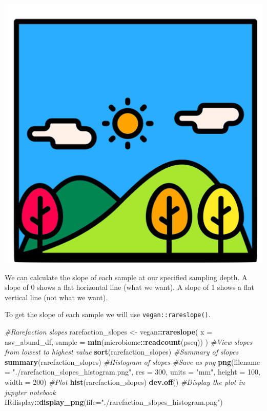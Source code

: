 \documentclass[
]{book}
\newenvironment{Shaded}{\begin{snugshade}}{\end{snugshade}}
\newcommand{\AttributeTok}[1]{\textcolor[rgb]{0.13,0.29,0.53}{#1}}
\newcommand{\CommentTok}[1]{\textcolor[rgb]{0.56,0.35,0.01}{\textit{#1}}}
\newcommand{\DecValTok}[1]{\textcolor[rgb]{0.00,0.00,0.81}{#1}}
\newcommand{\FunctionTok}[1]{\textcolor[rgb]{0.13,0.29,0.53}{\textbf{#1}}}
\newcommand{\NormalTok}[1]{#1}
\newcommand{\OtherTok}[1]{\textcolor[rgb]{0.56,0.35,0.01}{#1}}
\newcommand{\SpecialCharTok}[1]{\textcolor[rgb]{0.81,0.36,0.00}{\textbf{#1}}}
\newcommand{\StringTok}[1]{\textcolor[rgb]{0.31,0.60,0.02}{#1}}
\begin{document}
\includegraphics{figures/hill_landscape.png}

We can calculate the slope of each sample at our specified sampling depth.
A slope of 0 shows a flat horizontal line (what we want).
A slope of 1 shows a flat vertical line (not what we want).

To get the slope of each sample we will use \texttt{vegan::rareslope()}.

\begin{Shaded}
\begin{Highlighting}[]
\CommentTok{\#Rarefaction slopes}
\NormalTok{rarefaction\_slopes }\OtherTok{\textless{}{-}}\NormalTok{ vegan}\SpecialCharTok{::}\FunctionTok{rareslope}\NormalTok{(}
  \AttributeTok{x =}\NormalTok{ asv\_abund\_df, }\AttributeTok{sample =} \FunctionTok{min}\NormalTok{(microbiome}\SpecialCharTok{::}\FunctionTok{readcount}\NormalTok{(pseq))}
\NormalTok{)}
\CommentTok{\#View slopes from lowest to highest value}
\FunctionTok{sort}\NormalTok{(rarefaction\_slopes)}
\CommentTok{\#Summary of slopes}
\FunctionTok{summary}\NormalTok{(rarefaction\_slopes)}
\CommentTok{\#Histogram of slopes}
\CommentTok{\#Save as png}
\FunctionTok{png}\NormalTok{(}\AttributeTok{filename =} \StringTok{"./rarefaction\_slopes\_histogram.png"}\NormalTok{, }\AttributeTok{res =} \DecValTok{300}\NormalTok{,}
    \AttributeTok{units =} \StringTok{"mm"}\NormalTok{, }\AttributeTok{height =} \DecValTok{100}\NormalTok{, }\AttributeTok{width =} \DecValTok{200}\NormalTok{)}
\CommentTok{\#Plot}
\FunctionTok{hist}\NormalTok{(rarefaction\_slopes)}
\FunctionTok{dev.off}\NormalTok{()}
\CommentTok{\#Display the plot in jupyter notebook}
\NormalTok{IRdisplay}\SpecialCharTok{::}\FunctionTok{display\_png}\NormalTok{(}\AttributeTok{file=}\StringTok{"./rarefaction\_slopes\_histogram.png"}\NormalTok{)}
\end{Highlighting}
\end{Shaded}
\end{document}
